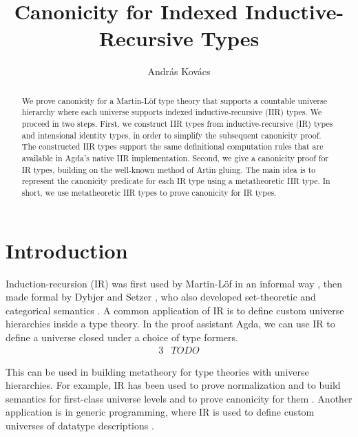 \documentclass[acmsmall,screen,review,anonymous]{acmart}
\begin{document}
\title{Canonicity for Indexed Inductive-Recursive Types}

\author{András Kovács}


\begin{abstract}
We prove canonicity for a Martin-Löf type theory that supports a countable universe hierarchy where
each universe supports indexed inductive-recursive (IIR) types. We proceed in two steps. First, we
construct IIR types from inductive-recursive (IR) types and intensional identity types, in order to
simplify the subsequent canonicity proof. The constructed IIR types support the same definitional
computation rules that are available in Agda's native IIR implementation. Second, we give a
canonicity proof for IR types, building on the well-known method of Artin gluing. The main idea is
to represent the canonicity predicate for each IR type using a metatheoretic IIR type. In short,
we use metatheoretic IIR types to prove canonicity for IR types.
\end{abstract}


\maketitle

\section{Introduction}\label{sec:introduction}

Induction-recursion (IR) was first used by Martin-Löf in an informal way \cite{TODO}, then made
formal by Dybjer and Setzer \cite{TODO}, who also developed set-theoretic and categorical semantics
\cite{TODO}. A common application of IR is to define custom universe hierarchies inside a type
theory. In the proof assistant Agda, we can use IR to define a universe closed under a choice of
type formers.
\begin{alignat*}{3}
& TODO
\end{alignat*}


This can
be used in building metatheory for type theories with universe hierarchies. For example, IR has been
used to prove normalization \cite{TODO} and to build semantics for first-class universe levels
\cite{TODO} and to prove canonicity for them \cite{TODO}. Another application is in generic
programming, where IR is used to define custom universes of datatype descriptions \cite{TODO}.









\end{document}
